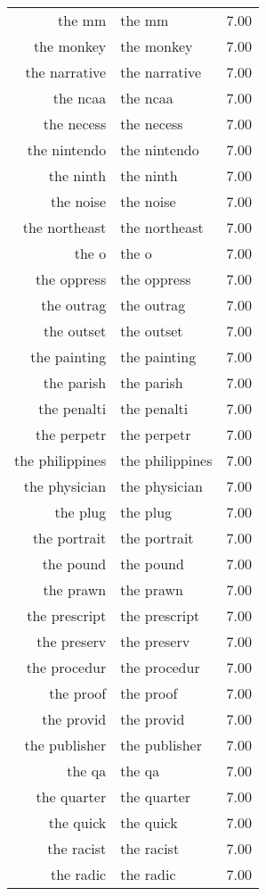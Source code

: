 \begin{table}[ht]
\begin{tabular}{rlr}
  the mm & the mm & 7.00 \\ 
  the monkey & the monkey & 7.00 \\ 
  the narrative & the narrative & 7.00 \\ 
  the ncaa & the ncaa & 7.00 \\ 
  the necess & the necess & 7.00 \\ 
  the nintendo & the nintendo & 7.00 \\ 
  the ninth & the ninth & 7.00 \\ 
  the noise & the noise & 7.00 \\ 
  the northeast & the northeast & 7.00 \\ 
  the o & the o & 7.00 \\ 
  the oppress & the oppress & 7.00 \\ 
  the outrag & the outrag & 7.00 \\ 
  the outset & the outset & 7.00 \\ 
  the painting & the painting & 7.00 \\ 
  the parish & the parish & 7.00 \\ 
  the penalti & the penalti & 7.00 \\ 
  the perpetr & the perpetr & 7.00 \\ 
  the philippines & the philippines & 7.00 \\ 
  the physician & the physician & 7.00 \\ 
  the plug & the plug & 7.00 \\ 
  the portrait & the portrait & 7.00 \\ 
  the pound & the pound & 7.00 \\ 
  the prawn & the prawn & 7.00 \\ 
  the prescript & the prescript & 7.00 \\ 
  the preserv & the preserv & 7.00 \\ 
  the procedur & the procedur & 7.00 \\ 
  the proof & the proof & 7.00 \\ 
  the provid & the provid & 7.00 \\ 
  the publisher & the publisher & 7.00 \\ 
  the qa & the qa & 7.00 \\ 
  the quarter & the quarter & 7.00 \\ 
  the quick & the quick & 7.00 \\ 
  the racist & the racist & 7.00 \\ 
  the radic & the radic & 7.00 \\ 

\end{tabular}
\end{table}

